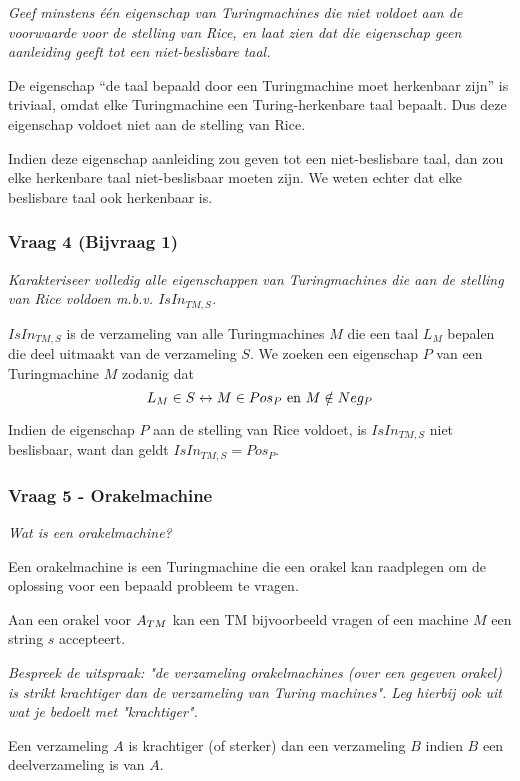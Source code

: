 \textit{Geef minstens één eigenschap van Turingmachines die niet voldoet aan de voorwaarde voor de stelling van Rice, en laat zien dat die eigenschap geen aanleiding geeft tot een niet-beslisbare taal.}

De eigenschap ``de taal bepaald door een Turingmachine moet herkenbaar zijn'' is triviaal, omdat elke Turingmachine een Turing-herkenbare taal bepaalt. Dus deze eigenschap voldoet niet aan de stelling van Rice.

Indien deze eigenschap aanleiding zou geven tot een niet-beslisbare taal, dan zou elke herkenbare taal niet-beslisbaar moeten zijn. We weten echter dat elke beslisbare taal ook herkenbaar is.

\subsubsection{Vraag 4 (Bijvraag 1)}

\textit{Karakteriseer volledig alle eigenschappen van Turingmachines die aan de stelling van Rice voldoen m.b.v. $IsIn_{TM,S}$.}

$IsIn_{TM,S}$ is de verzameling van alle Turingmachines $M$ die een taal $L_M$ bepalen die deel uitmaakt van de verzameling $S$. We zoeken een eigenschap $P$ van een Turingmachine $M$ zodanig dat
\begin{equation*}
  L_M \in S \leftrightarrow M \in Pos_P \text{ en } M \notin Neg_P
\end{equation*} 

Indien de eigenschap $P$ aan de stelling van Rice voldoet, is $IsIn_{TM,S}$ niet beslisbaar, want dan geldt $IsIn_{TM,S} = Pos_P$.

\subsubsection{Vraag 5 - Orakelmachine}

\textit{Wat is een orakelmachine?}

Een orakelmachine is een Turingmachine die een orakel kan raadplegen om de oplossing voor een bepaald probleem te vragen.

Aan een orakel voor ${A_{TM}}$ kan een TM bijvoorbeeld vragen of een machine $M$ een string $s$ accepteert.

\textit{Bespreek de uitspraak: "de verzameling orakelmachines (over een gegeven orakel) is strikt krachtiger dan de verzameling van Turing machines". Leg hierbij ook uit wat je bedoelt met "krachtiger".}

Een verzameling $A$ is krachtiger (of sterker) dan een verzameling $B$ indien $B$ een deelverzameling is van $A$.

